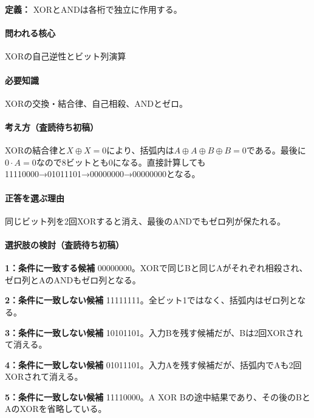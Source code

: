\noindent\textbf{定義：} XORとANDは各桁で独立に作用する。\par

\paragraph{問われる核心} XORの自己逆性とビット列演算

\paragraph{必要知識} XORの交換・結合律、自己相殺、ANDとゼロ。

\paragraph{考え方（査読待ち初稿）} XORの結合律と\(X\oplus X=0\)により、括弧内は\(A\oplus A\oplus B\oplus B=0\)である。最後に\(0\cdot A=0\)なので8ビットとも0になる。直接計算しても11110000→01011101→00000000→00000000となる。

\paragraph{正答を選ぶ理由} 同じビット列を2回XORすると消え、最後のANDでもゼロ列が保たれる。

\paragraph{選択肢の検討（査読待ち初稿）}\mbox{}\par

\noindent\textbf{1：条件に一致する候補} 00000000。XORで同じBと同じAがそれぞれ相殺され、ゼロ列とAのANDもゼロ列となる。\par

\noindent\textbf{2：条件に一致しない候補} 11111111。全ビット1ではなく、括弧内はゼロ列となる。\par

\noindent\textbf{3：条件に一致しない候補} 10101101。入力Bを残す候補だが、Bは2回XORされて消える。\par

\noindent\textbf{4：条件に一致しない候補} 01011101。入力Aを残す候補だが、括弧内でAも2回XORされて消える。\par

\noindent\textbf{5：条件に一致しない候補} 11110000。A XOR Bの途中結果であり、その後のBとAのXORを省略している。\par

